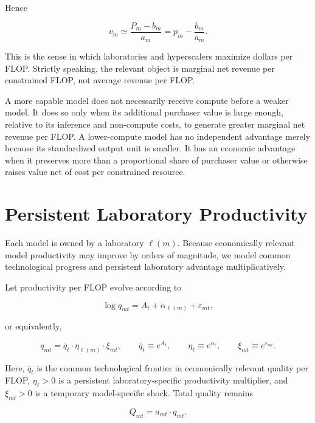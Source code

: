 \documentclass[11pt]{article}
\begin{document}
Hence

\begin{equation}v_m\simeq\frac{P_m-b_m}{a_m}=p_m-\frac{b_m}{a_m}.\end{equation}

This is the sense in which laboratories and hyperscalers maximize dollars per FLOP. Strictly speaking, the relevant object is marginal net revenue per constrained FLOP, not average revenue per FLOP.

A more capable model does not necessarily receive compute before a weaker model. It does so only when its additional purchaser value is large enough, relative to its inference and non-compute costs, to generate greater marginal net revenue per FLOP. A lower-compute model has no independent advantage merely because its standardized output unit is smaller. It has an economic advantage when it preserves more than a proportional share of purchaser value or otherwise raises value net of cost per constrained resource.

\section{Persistent Laboratory Productivity}
\label{sec:persistent-advantage}

Each model is owned by a laboratory $\ell(m)$. Because economically relevant model productivity may improve by orders of magnitude, we model common technological progress and persistent laboratory advantage multiplicatively.

Let productivity per FLOP evolve according to

\begin{equation}\log q_{mt}=A_t+\alpha_{\ell(m)}+\varepsilon_{mt},\end{equation}

or equivalently,

\begin{equation}q_{mt}=\bar q_t\cdot\eta_{\ell(m)}\cdot\xi_{mt},\qquad \bar q_t\equiv e^{A_t},\qquad \eta_\ell\equiv e^{\alpha_\ell},\qquad \xi_{mt}\equiv e^{\varepsilon_{mt}}.\end{equation}

Here, $\bar q_t$ is the common technological frontier in economically relevant quality per FLOP, $\eta_\ell>0$ is a persistent laboratory-specific productivity multiplier, and $\xi_{mt}>0$ is a temporary model-specific shock. Total quality remains

\begin{equation}Q_{mt}=a_{mt}\cdot q_{mt}.\end{equation}
\end{document}
